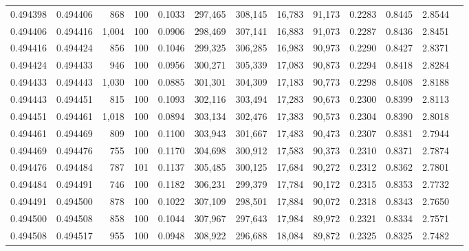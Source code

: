 \begin{tabular}{rrrrrrrrrrrrr}
0.494398 & 0.494406 &   868 & 100 &                                     0.1033 & 297,465 & 308,145 &  16,783 &  91,173 & 0.2283 & 0.8445 & 2.8544 \\
0.494406 & 0.494416 & 1,004 & 100 &                                     0.0906 & 298,469 & 307,141 &  16,883 &  91,073 & 0.2287 & 0.8436 & 2.8451 \\
0.494416 & 0.494424 &   856 & 100 &                                     0.1046 & 299,325 & 306,285 &  16,983 &  90,973 & 0.2290 & 0.8427 & 2.8371 \\
0.494424 & 0.494433 &   946 & 100 &                                     0.0956 & 300,271 & 305,339 &  17,083 &  90,873 & 0.2294 & 0.8418 & 2.8284 \\
0.494433 & 0.494443 & 1,030 & 100 &                                     0.0885 & 301,301 & 304,309 &  17,183 &  90,773 & 0.2298 & 0.8408 & 2.8188 \\
0.494443 & 0.494451 &   815 & 100 &                                     0.1093 & 302,116 & 303,494 &  17,283 &  90,673 & 0.2300 & 0.8399 & 2.8113 \\
0.494451 & 0.494461 & 1,018 & 100 &                                     0.0894 & 303,134 & 302,476 &  17,383 &  90,573 & 0.2304 & 0.8390 & 2.8018 \\
0.494461 & 0.494469 &   809 & 100 &                                     0.1100 & 303,943 & 301,667 &  17,483 &  90,473 & 0.2307 & 0.8381 & 2.7944 \\
0.494469 & 0.494476 &   755 & 100 &                                     0.1170 & 304,698 & 300,912 &  17,583 &  90,373 & 0.2310 & 0.8371 & 2.7874 \\
0.494476 & 0.494484 &   787 & 101 &                                     0.1137 & 305,485 & 300,125 &  17,684 &  90,272 & 0.2312 & 0.8362 & 2.7801 \\
0.494484 & 0.494491 &   746 & 100 &                                     0.1182 & 306,231 & 299,379 &  17,784 &  90,172 & 0.2315 & 0.8353 & 2.7732 \\
0.494491 & 0.494500 &   878 & 100 &                                     0.1022 & 307,109 & 298,501 &  17,884 &  90,072 & 0.2318 & 0.8343 & 2.7650 \\
0.494500 & 0.494508 &   858 & 100 &                                     0.1044 & 307,967 & 297,643 &  17,984 &  89,972 & 0.2321 & 0.8334 & 2.7571 \\
0.494508 & 0.494517 &   955 & 100 &                                     0.0948 & 308,922 & 296,688 &  18,084 &  89,872 & 0.2325 & 0.8325 & 2.7482 \\

\end{tabular}
